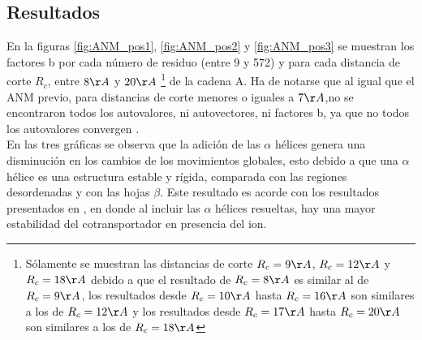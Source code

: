\subsection{Resultados}
En la figuras%
\ref{fig:ANM_pos1}, \ref{fig:ANM_pos2} y \ref{fig:ANM_pos3} %
se muestran los factores b por cada n\'{u}mero de residuo (entre 9 y 572) y para cada distancia de corte $R_c$, entre $8\AA$ y $20\AA$ \footnote{S\'{o}lamente se muestran las distancias de corte $R_c=9\AA$, $R_c=12\AA$ y $R_c=18\AA$ debido a que el resultado de $R_c=8\AA$ es similar al de $R_c=9\AA$, los resultados desde $R_c=10\AA$ hasta $R_c=16\AA$ son similares a los de $R_c=12\AA$ y los resultados desde $R_c=17\AA$ hasta $R_c=20\AA$ son similares a los de $R_c=18\AA$} de la cadena A. Ha de notarse que al igual que el ANM previo, para distancias de corte menores o iguales a $7\AA$,no se encontraron todos  los autovalores, ni autovectores, ni factores b, ya que no todos los autovalores convergen \cite{Zimmermann2011}.\\

En las tres gr\'{a}ficas se observa que la adici\'{o}n de las $\alpha$ h\'{e}lices genera una disminuci\'{o}n en los cambios de los movimientos globales, esto debido a que una $\alpha$ h\'{e}lice es una estructura estable y r\'{i}gida, comparada con las regiones desordenadas y con las hojas $\beta$. Este resultado es acorde con los resultados presentados en \cite{Adelman2016}, en donde al incluir las $\alpha$ h\'{e}lices resueltas, hay una mayor estabilidad del cotransportador en presencia del ion.\\

